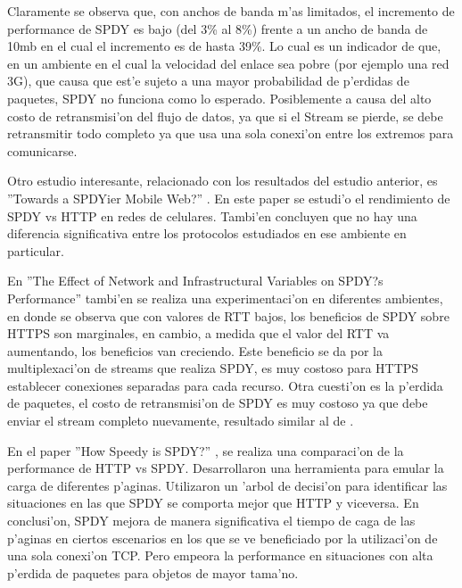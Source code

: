Claramente se observa que, con anchos de banda m'as limitados, el incremento de performance de SPDY es bajo (del 3\% al 8\%) frente a un ancho de banda de 10mb en el cual el incremento es de hasta 39\%. Lo cual es un indicador de que, en un ambiente en el cual la velocidad del enlace sea pobre (por ejemplo una red 3G), que causa que est'e sujeto a una mayor probabilidad de p'erdidas de paquetes, SPDY no funciona como lo esperado. Posiblemente a causa del alto costo de retransmisi'on del flujo de datos, ya que si el Stream se pierde, se debe retransmitir todo completo ya que usa una sola conexi'on entre los extremos para comunicarse.

Otro estudio interesante, relacionado con los resultados del estudio anterior, es ''Towards a SPDYier Mobile Web?'' \citep{towards}. En este paper se estudi'o el rendimiento de SPDY vs HTTP en redes de celulares. Tambi'en concluyen que no hay una diferencia significativa entre los protocolos estudiados en ese ambiente en particular.

En ''The Effect of Network and Infrastructural Variables on SPDY?s Performance'' \citep{effect} tambi'en se realiza una experimentaci'on en diferentes ambientes, en donde se observa que con valores de RTT bajos, los beneficios de SPDY sobre HTTPS son marginales, en cambio, a medida que el valor del RTT va aumentando, los beneficios van creciendo. Este beneficio se da por la multiplexaci'on de streams que realiza SPDY, es muy costoso para HTTPS establecer conexiones separadas para cada recurso. Otra cuesti'on es la p'erdida de paquetes, el costo de retransmisi'on de SPDY es muy costoso ya que debe enviar el stream completo nuevamente, resultado similar al de \citep{comparision}.

En el paper ''How Speedy is SPDY?'' \citep{howSpeedy}, se realiza una comparaci'on de la performance de HTTP vs SPDY. Desarrollaron una herramienta para emular la carga de diferentes p'aginas. Utilizaron un 'arbol de decisi'on para identificar las situaciones en las que SPDY se comporta mejor que HTTP y viceversa. En conclusi'on, SPDY mejora de manera significativa el tiempo de caga de las p'aginas en ciertos escenarios en los que se ve beneficiado por la utilizaci'on de una sola conexi'on TCP. Pero empeora la performance en situaciones con alta p'erdida de paquetes para objetos de mayor tama'no.
